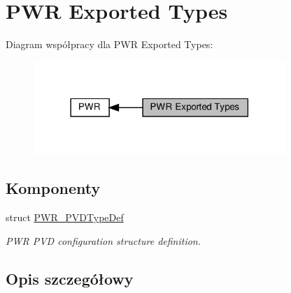 \hypertarget{group___p_w_r___exported___types}{}\section{P\+WR Exported Types}
\label{group___p_w_r___exported___types}
Diagram współpracy dla P\+WR Exported Types\+:\nopagebreak
\begin{figure}[H]
\begin{center}
\leavevmode
\includegraphics[width=270pt]{group___p_w_r___exported___types}
\end{center}
\end{figure}
\subsection*{Komponenty}
\begin{DoxyCompactItemize}
\item 
struct \hyperlink{struct_p_w_r___p_v_d_type_def}{P\+W\+R\+\_\+\+P\+V\+D\+Type\+Def}
\begin{DoxyCompactList}\small\item\em P\+WR P\+VD configuration structure definition. \end{DoxyCompactList}\end{DoxyCompactItemize}


\subsection{Opis szczegółowy}
